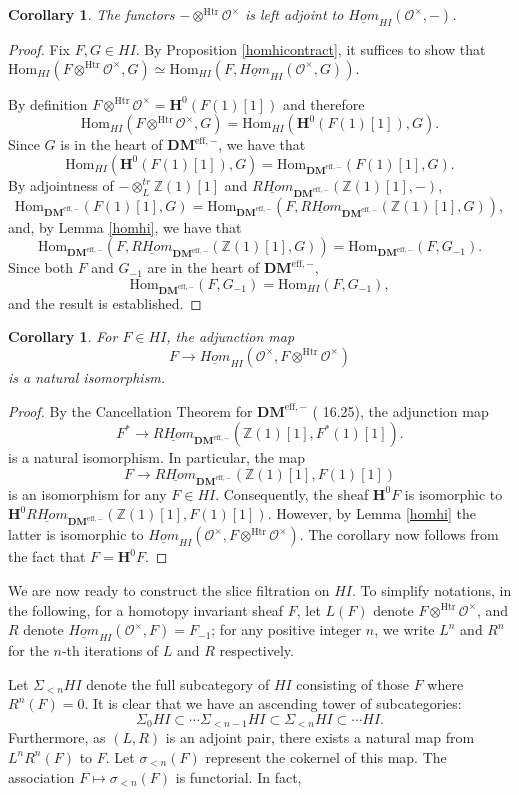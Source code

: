 \documentclass[11pt]{amsart}
\numberwithin{equation}{section}
\theoremstyle{plain} %
\newtheorem{cor}[equation]{Corollary}
\theoremstyle{definition}
\newcommand{\DMm}{\mathbf{DM}^{\mathrm{eff},-}}
\newcommand{\HI}{HI}
\newcommand{\tDM}{\otimes_{L}^{tr}}
\newcommand{\homDM}{\mathrm{Hom}_{\DMm}}
\newcommand{\rhomDM}{\underline{RHom}_{\DMm}}
\renewcommand{\H}{\mathbf{H}}
\newcommand{\tHI}{\otimes^{\mathrm{Htr}}}
\newcommand{\homHI}{\mathrm{Hom}_{\HI}}
\newcommand{\ihomHI}{\underline{Hom}_{\HI}}
\newcommand{\Ox}{\mathcal{O}^{\times}}
\newcommand{\Z}{\mathbb{Z}}
\newcommand{\sliceHI}{\sigma}
\newcommand{\SliceHI}{\Sigma}
\begin{document}
\begin{cor}\label{hiadj}
The functors $ - \tHI \Ox$ is left adjoint to $\ihomHI(\Ox, -)$.
\end{cor}
\begin{proof}
Fix $F, G \in \HI$. By Proposition \ref{homhicontract}, it 
suffices to show that $\homHI(F \tHI \Ox, G) \simeq \homHI(F, 
\ihomHI(\Ox, G)).$ 

By definition $F \tHI \Ox = \H^0(F(1)[1])$ and therefore
\[
\homHI(F \tHI \Ox, G) = \homHI(\H^0(F(1)[1]), G).
\]
Since $G$ is in the heart of $\DMm$, we have that
\[
\homHI(\H^0(F(1)[1]), G) = \homDM(F(1)[1], G).
\]
By adjointness of $-\tDM \Z(1)[1]$ and $\rhomDM(\Z(1)[1], -)$,
\[
\homDM(F(1)[1], G) = \homDM(F, \rhomDM(\Z(1)[1], G)),
\]
and, by Lemma \ref{homhi}, we have that
\[
\homDM(F, \rhomDM(\Z(1)[1], G)) = \homDM(F, G_{-1}).
\]
Since both $F$ and $G_{-1}$ are in the heart of $\DMm$,
\[
\homDM(F, G_{-1}) = \homHI(F, G_{-1}),
\]
and the result is established.
\end{proof}

\begin{cor}
For $F \in \HI$, the adjunction map 
\[
F \longrightarrow \ihomHI(\Ox, F \tHI \Ox)
\] 
is a natural isomorphism.
\end{cor}
\begin{proof}
By the Cancellation Theorem for $\DMm$ (\cite{MVW} 16.25), the 
adjunction map 
\[
F^* \longrightarrow \rhomDM(\Z(1)[1], F^*(1)[1]).
\] 
is a natural isomorphism. In particular, the map 
\[
F \longrightarrow \rhomDM(\Z(1)[1], F(1)[1])
\]
is an isomorphism for any $F \in \HI$. Consequently, the sheaf 
$\H^0 F$ is isomorphic to $\H^0\rhomDM(\Z(1)[1],\allowbreak 
F(1)[1]).$ However, by Lemma \ref{homhi} the latter is isomorphic 
to $\ihomHI(\Ox,\allowbreak F \tHI\Ox)$. The corollary now 
follows from the fact that $F = \H^0 F$.
\end{proof}

We are now ready to construct the slice filtration on $\HI$. 
To simplify notations, in the following, for a homotopy invariant
sheaf $F$, let $L(F)$ denote $F \tHI \Ox$, and $R$ denote 
$\ihomHI(\Ox, F) = F_{-1}$; for any positive integer $n$, we 
write $L^n$ and $R^n$ for the $n$-th iterations of $L$ and $R$ 
respectively.

Let $\SliceHI_{< n} \HI$ denote the full subcategory of $\HI$ 
consisting of those $F$ where $R^n(F) = 0$. It is clear that we 
have an ascending tower of subcategories:
\[
\SliceHI_{0} \HI \subset \cdots \SliceHI_{< n - 1} \HI \subset 
\SliceHI_{< n} \HI \subset \cdots \HI.
\]
Furthermore, as $(L, R)$ is an adjoint pair, there exists a 
natural map from $L^nR^n(F)$ to $F$. Let $\sliceHI_{< n}(F)$ represent 
the cokernel of this map. The association $F \mapsto 
\sliceHI_{< n}(F)$ is functorial. In fact,
\end{document}
